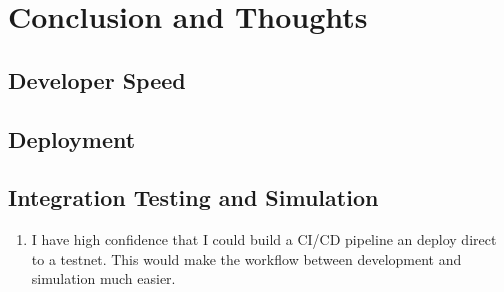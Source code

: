 \chapter{Conclusion and Thoughts}

\section{Developer Speed}

\section{Deployment}


\section{Integration Testing and Simulation}


\begin{enumerate}
    \item I have high confidence that I could build a CI/CD pipeline an deploy direct to a testnet.
        This would make the workflow between development and simulation much easier.
\end{enumerate}